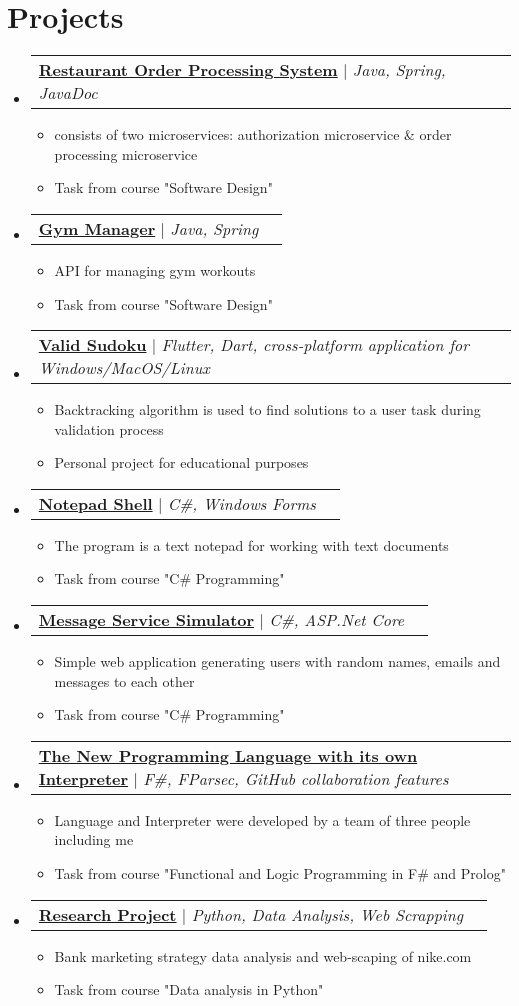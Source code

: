\documentclass[letterpaper,11pt]{article}
\makeatletter
\newcommand{\resumeItem}[1]{
  \item\small{
    {#1 \vspace{-2pt}}
  }
}
\newcommand{\resumeProjectHeading}[2]{
    \item
    \begin{tabular*}{0.97\textwidth}{l@{\extracolsep{\fill}}r}
      \small#1 & #2 \\
    \end{tabular*}\vspace{-7pt}
}
\newcommand{\resumeSubHeadingListStart}{\begin{itemize}[leftmargin=0.15in, label={}]}
\newcommand{\resumeSubHeadingListEnd}{\end{itemize}}
\newcommand{\resumeItemListStart}{\begin{itemize}}
\newcommand{\resumeItemListEnd}{\end{itemize}\vspace{-5pt}}
\makeatother
\begin{document}
\section{Projects}
    \resumeSubHeadingListStart
          \resumeProjectHeading
          {\href{https://github.com/lkhorasandzhian/restaurant-order-processing-system}{\textbf{Restaurant Order Processing System}} $|$ \emph{Java, Spring, JavaDoc}}{}
          \resumeItemListStart
            \resumeItem{consists of two microservices: authorization microservice \& order processing microservice}
            \resumeItem{Task from course "Software Design"}
          \resumeItemListEnd
          \resumeProjectHeading
          {\href{https://github.com/lkhorasandzhian/kpo-gym}{\textbf{Gym Manager}} $|$ \emph{Java, Spring}}{}
          \resumeItemListStart
            \resumeItem{API for managing gym workouts}
            \resumeItem{Task from course "Software Design"}
          \resumeItemListEnd
          \resumeProjectHeading
          {\href{https://github.com/lkhorasandzhian/valid_sudoku}{\textbf{Valid Sudoku}} $|$ \emph{Flutter, Dart, cross-platform application for Windows/MacOS/Linux}}{}
          \resumeItemListStart
            \resumeItem{Backtracking algorithm is used to find solutions to a user task during validation process}
            \resumeItem{Personal project for educational purposes}
          \resumeItemListEnd
          \resumeProjectHeading
          {\href{https://github.com/lkhorasandzhian/notepad-shell}{\textbf{Notepad Shell}} $|$ \emph{C\#, Windows Forms}}{}
          \resumeItemListStart
            \resumeItem{The program is a text notepad for working with text documents}
            \resumeItem{Task from course "C\# Programming"}
          \resumeItemListEnd
          \resumeProjectHeading
          {\href{https://github.com/lkhorasandzhian/message-service-simulator}{\textbf{Message Service Simulator}} $|$ \emph{C\#, ASP.Net Core}}{}
          \resumeItemListStart
            \resumeItem{Simple web application generating users with random names, emails and messages to each other}
            \resumeItem{Task from course "C\# Programming"}
          \resumeItemListEnd
          \resumeProjectHeading
          {\href{https://github.com/lkhorasandzhian/fp-compiler-lab-mosmetro}{\textbf{The New Programming Language with its own Interpreter}} $|$ \emph{F\#, FParsec, GitHub collaboration features}}{}
          \resumeItemListStart
            \resumeItem{Language and Interpreter were developed by a team of three people including me}
            \resumeItem{Task from course "Functional and Logic Programming in F\# and Prolog"}
          \resumeItemListEnd
          \resumeProjectHeading
          {\href{https://github.com/lkhorasandzhian/research-project}{\textbf{Research Project}} $|$ \emph{Python, Data Analysis, Web Scrapping}}{}
          \resumeItemListStart
            \resumeItem{Bank marketing strategy data analysis and web-scaping of nike.com}
            \resumeItem{Task from course "Data analysis in Python"}
          \resumeItemListEnd
    \resumeSubHeadingListEnd
\end{document}
